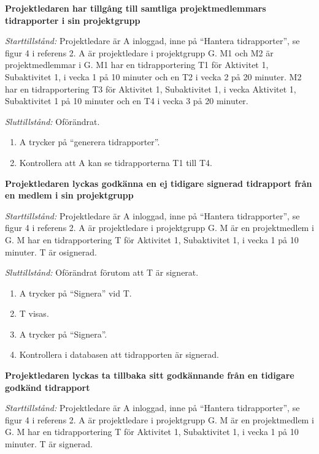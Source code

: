 \documentclass[a4paper]{article}
\begin{document}
\begin{FT}

\item
\textbf{Projektledaren har tillgång till samtliga projektmedlemmars tidrapporter i sin projektgrupp}

\emph{Starttillstånd:} Projektledare är A inloggad, inne på ``Hantera tidrapporter'', se figur 4 i referens 2. A är projektledare i projektgrupp G. M1 och M2 är projektmedlemmar i G. M1 har en tidrapportering T1 för Aktivitet 1, Subaktivitet 1, i vecka 1 på 10 minuter och en T2 i vecka 2 på 20 minuter. M2 har en tidrapportering T3 för Aktivitet 1, Subaktivitet 1, i vecka Aktivitet 1, Subaktivitet 1 på 10 minuter och en T4 i vecka 3 på 20 minuter. 

\emph{Sluttillstånd:} Oförändrat.

\begin{enumerate}
\item A trycker på ``generera tidrapporter''.
\item Kontrollera att A kan se tidrapporterna T1 till T4.
\end{enumerate}


\item
\textbf{Projektledaren lyckas godkänna en ej tidigare signerad tidrapport från en medlem i sin projektgrupp}

\emph{Starttillstånd:} Projektledare är A inloggad, inne på ``Hantera tidrapporter'', se figur 4 i referens 2. A är projektledare i projektgrupp G. M är en projektmedlem i G. M har en tidrapportering T för Aktivitet 1, Subaktivitet 1, i vecka 1 på 10 minuter. T är osignerad.

\emph{Sluttillstånd:} Oförändrat förutom att T är signerat.

\begin{enumerate}
\item A trycker på ``Signera'' vid T.
\item T visas.
\item A trycker på ``Signera''.
\item Kontrollera i databasen att tidrapporten är signerad.
\end{enumerate}


\item
\textbf{Projektledaren lyckas ta tillbaka sitt godkännande från en tidigare godkänd tidrapport}

\emph{Starttillstånd:} Projektledare är A inloggad, inne på ``Hantera tidrapporter'', se figur 4 i referens 2. A är projektledare i projektgrupp G. M är en projektmedlem i G. M har en tidrapportering T för Aktivitet 1, Subaktivitet 1, i vecka 1 på 10 minuter. T är signerad.


\end{FT}
\end{document}
